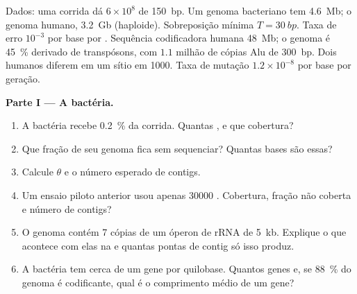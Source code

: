 \begin{problem}
\label{pb:b3:genomics:1}
Dados: uma corrida dá $6\times 10^{8}$  de \qty{150}{bp}. Um
genoma bacteriano tem \qty{4.6}{Mb}; o genoma humano, \qty{3.2}{Gb}
(haploide). Sobreposição mínima $T = \qty{30}{bp}$. Taxa de erro
$10^{-3}$ por base por . Sequência codificadora humana
\qty{48}{Mb}; o genoma é \qty{45}{\%} derivado de transpósons, com
$1.1$ milhão de cópias Alu de \qty{300}{bp}. Dois humanos diferem em um
sítio em \num{1000}. Taxa de mutação $1.2\times 10^{-8}$ por base por
geração.

\medskip
\noindent\textbf{Parte I --- A bactéria.}
\begin{enumerate}
  \item A bactéria recebe \qty{0.2}{\%} da corrida. Quantas , e
        que cobertura?
  \item Que fração de seu genoma fica sem sequenciar? Quantas bases são
        essas?
  \item Calcule $\theta$ e o número esperado de contigs.
  \item Um ensaio piloto anterior usou apenas \num{30000} .
        Cobertura, fração não coberta e número de contigs?
  \item O genoma contém \num{7} cópias de um óperon de rRNA de
        \qty{5}{kb}. Explique o que acontece com elas na  e
        quantas pontas de contig só isso produz.
  \item A bactéria tem cerca de um gene por quilobase. Quantos genes e,
        se \qty{88}{\%} do genoma é codificante, qual é o comprimento
        médio de um gene?
\end{enumerate}


\end{problem}
